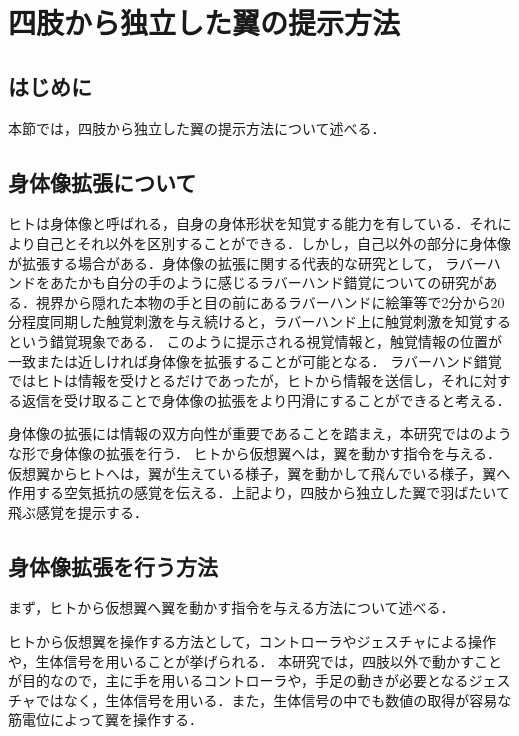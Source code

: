 \chapter[四肢から独立した翼の提示方法]%
        {四肢から独立した翼の提示方法}

\section{はじめに}
    本節では，四肢から独立した翼の提示方法について述べる．
    
\section{身体像拡張について}
    ヒトは身体像と呼ばれる，自身の身体形状を知覚する能力を有している．それにより自己とそれ以外を区別することができる．しかし，自己以外の部分に身体像が拡張する場合がある．身体像の拡張に関する代表的な研究として，
    ラバーハンドをあたかも自分の手のように感じるラバーハンド錯覚についての研究がある\cite{botvinick1998rubber}．視界から隠れた本物の手と目の前にあるラバーハンドに絵筆等で2分から20分程度同期した触覚刺激を与え続けると，ラバーハンド上に触覚刺激を知覚するという錯覚現象である．
    このように提示される視覚情報と，触覚情報の位置が一致または近しければ身体像を拡張することが可能となる．
    ラバーハンド錯覚ではヒトは情報を受けとるだけであったが，ヒトから情報を送信し，それに対する返信を受け取ることで身体像の拡張をより円滑にすることができると考える．

    身体像の拡張には情報の双方向性が重要であることを踏まえ，本研究ではのような形で身体像の拡張を行う．
    ヒトから仮想翼へは，翼を動かす指令を与える．仮想翼からヒトへは，翼が生えている様子，翼を動かして飛んでいる様子，翼へ作用する空気抵抗の感覚を伝える．上記より，四肢から独立した翼で羽ばたいて飛ぶ感覚を提示する．

\section{身体像拡張を行う方法}
    まず，ヒトから仮想翼へ翼を動かす指令を与える方法について述べる．

    ヒトから仮想翼を操作する方法として，コントローラやジェスチャによる操作や，生体信号を用いることが挙げられる．
    本研究では，四肢以外で動かすことが目的なので，主に手を用いるコントローラや，手足の動きが必要となるジェスチャではなく，生体信号を用いる．また，生体信号の中でも数値の取得が容易な筋電位によって翼を操作する．

